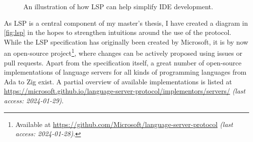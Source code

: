 \documentclass{scrartcl}
\newcommand{\web}[2]{\url{#1} \textit{(last access: #2)}}
\begin{document}
\begin{figure}
  \begin{center}
  \end{center}
  \caption{An illustration of how LSP can help simplify IDE development.}\label{fig:lsp}
\end{figure}

\noindent{}As LSP is a central component of my master's thesis, I have created a diagram in \autoref{fig:lsp} in the hopes to strengthen intuitions around the use of the protocol.
While the LSP specification has originally been created by Microsoft, it is by now an open-source project\footnote{
  Available at \web{https://github.com/Microsoft/language-server-protocol}{2024-01-28}.
}, where changes can be actively proposed using issues or pull requests.
Apart from the specification itself, a great number of open-source implementations of language servers for all kinds of programming languages from Ada to Zig exist.
A partial overview of available implementations is listed at \web{https://microsoft.github.io/language-server-protocol/implementors/servers/}{2024-01-29}.
\end{document}
